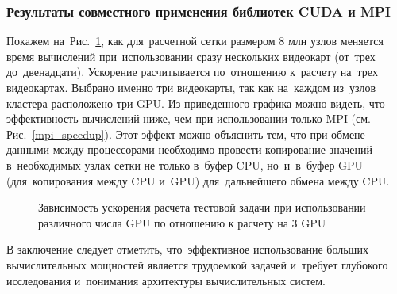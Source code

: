 \subsubsection{Результаты совместного применения библиотек CUDA и MPI}

Покажем на~Рис.~\ref{many_gpu}, как для~расчетной сетки размером 8 млн узлов меняется время вычислений
при~использовании сразу нескольких видеокарт (от~трех до~двенадцати). Ускорение расчитывается по~отношению
к~расчету на~трех видеокартах.
Выбрано именно три видеокарты, так как на~каждом из~узлов кластера расположено три GPU. Из приведенного графика можно видеть,
что эффективность вычислений ниже, чем при использовании только MPI (см. Рис.~\ref{mpi_speedup}). Этот эффект можно
объяснить тем, что при обмене данными между процессорами необходимо провести копирование значений в~необходимых
узлах сетки не только в~буфер CPU, но~и~в~буфер GPU (для~копирования между CPU и~GPU) для~дальнейшего обмена между CPU.

\begin{figure}[!h]
\begin{center}
\caption{Зависимость ускорения расчета тестовой задачи при использовании различного числа GPU по отношению к расчету на 3 GPU}
\label{many_gpu}
\end{center}
\end{figure}

В заключение следует отметить, что~эффективное использование больших вычислительных
мощностей является трудоемкой задачей и~требует глубокого исследования и~понимания
архитектуры вычислительных систем.
